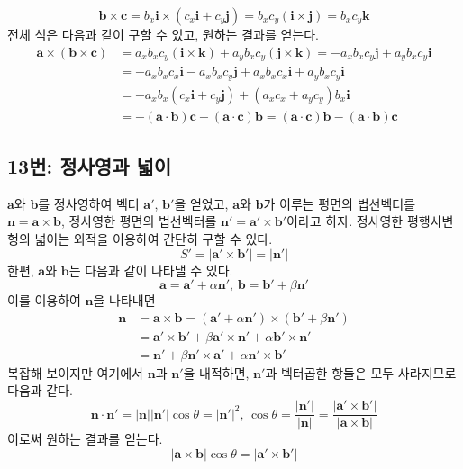 \documentclass{scrartcl}
\begin{document}
\[\mathbf{b}\times\mathbf{c}=b_x\mathbf{i}\times(c_x\mathbf{i}+c_y\mathbf{j})=b_xc_y(\mathbf{i}\times\mathbf{j})=b_xc_y\mathbf{k}\]
전체 식은 다음과 같이 구할 수 있고, 원하는 결과를 얻는다.
\begin{align*}
\mathbf{a}\times(\mathbf{b}\times\mathbf{c})&=a_xb_xc_y(\mathbf{i}\times\mathbf{k})+a_yb_xc_y(\mathbf{j}\times\mathbf{k})=-a_xb_xc_y\mathbf{j}+a_yb_xc_y\mathbf{i} \\
&=-a_xb_xc_x\mathbf{i}-a_xb_xc_y\mathbf{j}+a_xb_xc_x\mathbf{i}+a_yb_xc_y\mathbf{i} \\
&=-a_xb_x(c_x\mathbf{i}+c_y\mathbf{j})+(a_xc_x+a_yc_y)b_x\mathbf{i} \\
&=-(\mathbf{a}\cdot\mathbf{b})\mathbf{c}+(\mathbf{a}\cdot\mathbf{c})\mathbf{b}=(\mathbf{a}\cdot\mathbf{c})\mathbf{b}-(\mathbf{a}\cdot\mathbf{b})\mathbf{c}
\end{align*}

\subsection{13번: 정사영과 넓이}
\(\mathbf{a}\)와 \(\mathbf{b}\)를 정사영하여 벡터 \(\mathbf{a}'\), \(\mathbf{b}'\)을 얻었고, \(\mathbf{a}\)와 \(\mathbf{b}\)가 이루는 평면의 법선벡터를 \(\mathbf{n}=\mathbf{a}\times\mathbf{b}\), 정사영한 평면의 법선벡터를 \(\mathbf{n}'=\mathbf{a}'\times\mathbf{b}'\)이라고 하자. 정사영한 평행사변형의 넓이는 외적을 이용하여 간단히 구할 수 있다.
\[S'=\left|\mathbf{a}'\times\mathbf{b}'\right|=\left|\mathbf{n}'\right|\]
한편, \(\mathbf{a}\)와 \(\mathbf{b}\)는 다음과 같이 나타낼 수 있다.
\[\mathbf{a}=\mathbf{a}'+\alpha\mathbf{n}',\,\mathbf{b}=\mathbf{b}'+\beta\mathbf{n}'\]
이를 이용하여 \(\mathbf{n}\)을 나타내면
\begin{align*}
\mathbf{n}&=\mathbf{a}\times\mathbf{b}=\left(\mathbf{a}'+\alpha\mathbf{n}'\right)\times\left(\mathbf{b}'+\beta\mathbf{n}'\right) \\
&=\mathbf{a}'\times\mathbf{b}'+\beta\mathbf{a}'\times\mathbf{n}'+\alpha\mathbf{b}'\times\mathbf{n}' \\
&=\mathbf{n}'+\beta\mathbf{n}'\times\mathbf{a}'+\alpha\mathbf{n}'\times\mathbf{b}'
\end{align*}
복잡해 보이지만 여기에서 \(\mathbf{n}\)과 \(\mathbf{n}'\)을 내적하면, \(\mathbf{n}'\)과 벡터곱한 항들은 모두 사라지므로 다음과 같다.
\[\mathbf{n}\cdot\mathbf{n}'=\left|\mathbf{n}\right|\left|\mathbf{n}'\right|\cos\theta=\left|\mathbf{n}'\right|^2,\,\cos\theta=\frac{\left|\mathbf{n}'\right|}{\left|\mathbf{n}\right|}=\frac{\left|\mathbf{a}'\times\mathbf{b}'\right|}{\left|\mathbf{a}\times\mathbf{b}\right|}\]
이로써 원하는 결과를 얻는다.
\[\left|\mathbf{a}\times\mathbf{b}\right|\cos\theta=\left|\mathbf{a}'\times\mathbf{b}'\right|\]
\end{document}
